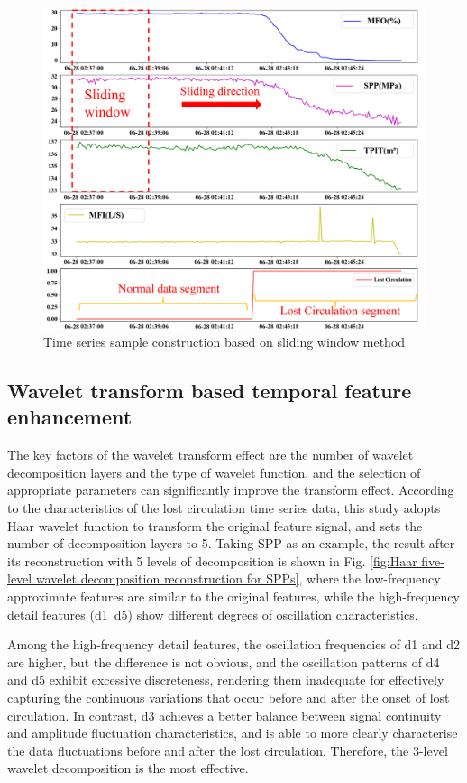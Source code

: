 \documentclass[journal,article,submit,pdftex,moreauthors]{Definitions/mdpi}
\begin{document}
\begin{figure}[H]
    \centering
    \includegraphics[width=0.75\linewidth]{图片/滑动窗口.png}
    \caption{Time series sample construction based on sliding window method}
    \label{fig:Time series sample construction based on sliding window method}
\end{figure}

\subsection{Wavelet transform based temporal feature enhancement}

The key factors of the wavelet transform effect are the number of wavelet decomposition layers and the type of wavelet function, and the selection of appropriate parameters can significantly improve the transform effect. According to the characteristics of the lost circulation time series data, this study adopts Haar wavelet function to transform the original feature signal, and sets the number of decomposition layers to 5. Taking SPP as an example, the result after its reconstruction with 5 levels of decomposition is shown in Fig.  \ref{fig:Haar five-level wavelet decomposition reconstruction for SPPs}, where the low-frequency approximate features are similar to the original features, while the high-frequency detail features (d1~d5) show different degrees of oscillation characteristics.

Among the high-frequency detail features, the oscillation frequencies of d1 and d2 are higher, but the difference is not obvious, and the oscillation patterns of d4 and d5 exhibit excessive discreteness, rendering them inadequate for effectively capturing the continuous variations that occur before and after the onset of lost circulation. In contrast, d3 achieves a better balance between signal continuity and amplitude fluctuation characteristics, and is able to more clearly characterise the data fluctuations before and after the lost circulation. Therefore, the 3-level wavelet decomposition is the most effective.
\end{document}
